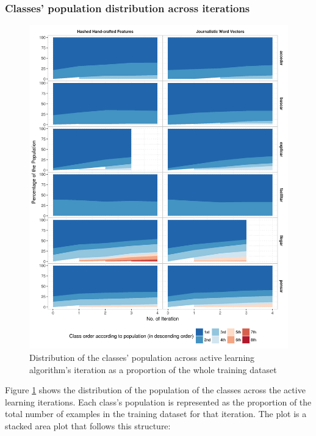 \subsubsection{Classes' population distribution across iterations}

\begin{figure}[htb!]
  \centering
  \includegraphics[height=0.9\textheight,width=\textwidth,keepaspectratio]
    {plots/active/population_distribution}
  \caption{Distribution of the classes' population across active learning
  algorithm's iteration as a proportion of the whole training dataset}
  \label{fig:active:population_distribution}
\end{figure}

Figure \ref{fig:active:population_distribution} shows the distribution of the
population of the classes across the active learning iterations. Each class's
population is represented as the proportion of the total number of examples in
the training dataset for that iteration. The plot is a stacked area plot that
follows this structure:

